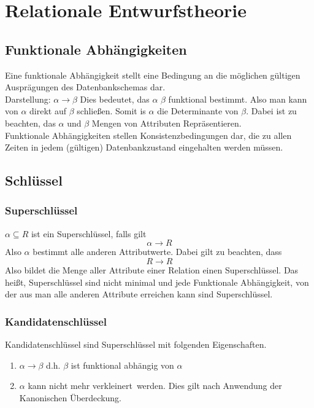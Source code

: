 \chapter{Relationale Entwurfstheorie}
\section{Funktionale Abhängigkeiten}
Eine funktionale Abhängigkeit stellt eine Bedingung an die möglichen gültigen Ausprägungen des Datenbankschemas dar. \\

Darstellung: $\alpha \rightarrow \beta$ Dies bedeutet, das $\alpha$ $\beta$ funktional bestimmt. Also man kann von $\alpha$ direkt auf $\beta$ schließen. Somit is $\alpha$ die Determinante von $\beta$. Dabei ist zu beachten, das $\alpha$ und $\beta$ Mengen von Attributen Repräsentieren.\\ 

Funktionale Abhängigkeiten stellen Konsistenzbedingungen dar, die zu allen Zeiten in jedem (gültigen) Datenbankzustand eingehalten werden müssen. \\

\section{Schlüssel}
\subsection{Superschlüssel}
$\alpha \subseteq R$ ist ein Superschlüssel, falls gilt\\
\[\alpha\rightarrow R\]
Also $\alpha$ bestimmt alle anderen Attributwerte. Dabei gilt zu beachten, dass
\[R\rightarrow R\]
Also bildet die Menge aller Attribute einer Relation einen Superschlüssel. Das heißt, Superschlüssel sind nicht minimal und jede Funktionale Abhängigkeit, von der aus man alle anderen Attribute erreichen kann sind Superschlüssel.
\subsection{Kandidatenschlüssel} 
Kandidatenschlüssel sind Superschlüssel mit folgenden Eigenschaften. 
\begin{enumerate}
\item $\alpha \rightarrow \beta$ d.h. $\beta$ ist funktional abhängig von $\alpha$
\item $\alpha$ kann nicht mehr \glqq verkleinert\grqq   ~werden. Dies gilt nach Anwendung der Kanonischen Überdeckung.
\end{enumerate}
